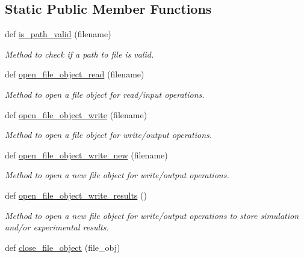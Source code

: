 \subsection*{Static Public Member Functions}
\begin{DoxyCompactItemize}
\item 
def \hyperlink{classutilities_1_1file__io_1_1file__io__operations_a5c4be751037b1ba20bb57884b93e7445}{is\+\_\+path\+\_\+valid} (filename)
\begin{DoxyCompactList}\small\item\em Method to check if a path to file is valid. \end{DoxyCompactList}\item 
def \hyperlink{classutilities_1_1file__io_1_1file__io__operations_a1a7ef324955033ad370338fe37e68194}{open\+\_\+file\+\_\+object\+\_\+read} (filename)
\begin{DoxyCompactList}\small\item\em Method to open a file object for read/input operations. \end{DoxyCompactList}\item 
def \hyperlink{classutilities_1_1file__io_1_1file__io__operations_aaf94e26da1d988ece479d1600ad1de4a}{open\+\_\+file\+\_\+object\+\_\+write} (filename)
\begin{DoxyCompactList}\small\item\em Method to open a file object for write/output operations. \end{DoxyCompactList}\item 
def \hyperlink{classutilities_1_1file__io_1_1file__io__operations_aefa9041777265e5066f9f5a48fb5a21e}{open\+\_\+file\+\_\+object\+\_\+write\+\_\+new} (filename)
\begin{DoxyCompactList}\small\item\em Method to open a new file object for write/output operations. \end{DoxyCompactList}\item 
def \hyperlink{classutilities_1_1file__io_1_1file__io__operations_ad091638ea961413dba6775d065c0d589}{open\+\_\+file\+\_\+object\+\_\+write\+\_\+results} ()
\begin{DoxyCompactList}\small\item\em Method to open a new file object for write/output operations to store simulation and/or experimental results. \end{DoxyCompactList}\item 
def \hyperlink{classutilities_1_1file__io_1_1file__io__operations_a15cce5bd7767b057cdc569f393c24866}{close\+\_\+file\+\_\+object} (file\+\_\+obj)

\end{DoxyCompactItemize}

